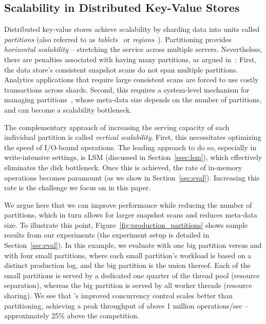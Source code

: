 \subsection{Scalability in Distributed Key-Value Stores}
Distributed key-value stores achieve scalability by sharding data into units called {\em partitions}
(also referred to as \emph{tablets}~\cite{Bigtable2006, PNUTS2008} or \emph{regions}~\cite{hbase}).
%
Partitioning provides {\em horizontal scalability} -- stretching the service across multiple servers.
Nevertheless, there are penalties associated with having many partitions, as argued in~\cite{hbaseRegionArch}:
First, the data store's consistent snapshot scans do not span multiple partitions. Analytics applications that
require large consistent scans are forced to use costly transactions across shards.
%
Second, this requires a system-level mechanism for managing partitions~\cite{Bigtable2006,PNUTS2008,hbase}, whose meta-data size depends on the number of partitions, and can become a scalability bottleneck.




The complementary approach of
increasing the serving capacity of each individual partition is called
\emph{vertical scalability}. First, this necessitates optimizing the speed of I/O-bound operations.
The leading approach to do so, especially in write-intensive settings,
is  LSM  (discussed in Section~\ref{ssec:lsm}), which
effectively eliminates the disk bottleneck.
Once this is achieved, the rate of in-memory operations becomes paramount (as we show in Section~\ref{sec:eval}).
Increasing this rate is the challenge we focus on in this paper.

We argue here that we can improve performance while reducing the number of partitions,
which in turn allows for larger snapshot scans and reduces meta-data size.
To illustrate this point, Figure~\ref{fig:production_partitions} shows sample results from our experiments (the experiment
setup is detailed in Section~\ref{sec:eval}). In this example, we evaluate {\clsm\/} with one big partition
versus {\leveldb\/} and {\hyperleveldb\/} with four small partitions, where each small partition's workload
is based on a distinct production log, and the big partition is the union thereof. Each of the small partitions is served
by a dedicated one quarter of the thread pool (resource separation), whereas the big partition is served by all
worker threads (resource sharing).
We see that {\clsm\/}'s improved concurrency control scales better than partitioning, achieving a peak throughput of above 1 million operations/sec -- approximately 25\% above the competition.


